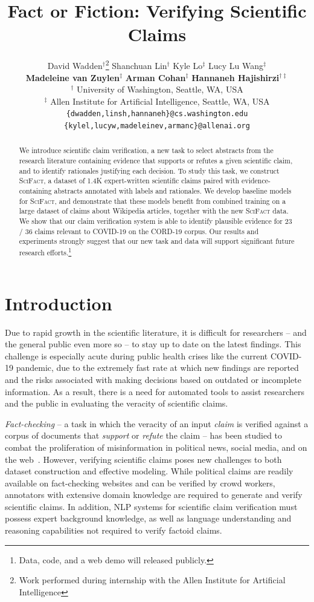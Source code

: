 \documentclass[11pt,a4paper]{article}
\title{Fact or Fiction: Verifying Scientific Claims}
\author{David Wadden$^\mathbf{\dagger}$\thanks{\xspace \xspace Work performed during internship with the Allen Institute for Artificial Intelligence} \quad
Shanchuan Lin$^\mathbf{\dagger}$ \quad
Kyle Lo$^\mathbf{\ddagger}$ \quad
Lucy Lu Wang$^\mathbf{\ddagger}$ \\
{\bf Madeleine van Zuylen}$^\mathbf{\ddagger}$ \quad
{\bf Arman Cohan}$^\mathbf{\ddagger}$ \quad
{\bf Hannaneh Hajishirzi}$^\mathbf{\dagger\ddagger}$\\
  $^\mathbf{\dagger}$
  University of Washington, Seattle, WA, USA \\
  $^\mathbf{\ddagger}$
  Allen Institute for Artificial Intelligence, Seattle, WA, USA \\
  {\tt\small \{dwadden,linsh,hannaneh\}@cs.washington.edu} \\
  {\tt\small \{kylel,lucyw,madeleinev,armanc\}@allenai.org}
}
\date{}
\newcommand{\ours}{\textsc{SciFact}\xspace}
\begin{document}
\maketitle


\begin{abstract}






We introduce scientific claim verification, a new task to select abstracts from the research literature containing evidence that supports or refutes a given scientific claim, and to identify rationales justifying each decision. To study this task, we construct \ours, a dataset of 1.4K expert-written scientific claims paired with evidence-containing abstracts annotated with labels and rationales. We develop baseline models for \ours, and demonstrate that these models benefit from combined training on a large dataset of claims about Wikipedia articles, together with the new \ours data. We show that our claim verification system is able to identify plausible evidence for 23 / 36 claims relevant to COVID-19 on the CORD-19 corpus. Our results and experiments strongly suggest that our new task and data will support significant future research efforts.\footnote{Data, code, and a web demo will released publicly.}


\end{abstract} \section{Introduction} \label{sec:introduction}




Due to rapid growth in the scientific literature, it is difficult for researchers -- and the general public even more so -- to stay up to date on the latest findings. This challenge is especially acute during public health crises like the current COVID-19 pandemic, due to the extremely fast rate at which new findings are reported and the risks associated with making decisions based on outdated or incomplete information. As a result, there is a need for automated tools to assist researchers and the public in evaluating the veracity of scientific claims. 


\emph{Fact-checking} -- a task in which the veracity of an input \emph{claim} is verified against a corpus of documents that \emph{support} or \emph{refute} the claim -- has been studied to combat the proliferation of misinformation in political news, social media, and on the web~\cite{Thorne2018FEVERAL,Hanselowski2019ARA}. However, verifying scientific claims poses new challenges to both dataset construction and effective modeling. While political claims are readily available on fact-checking websites and can be verified by crowd workers, annotators with extensive domain knowledge are required to generate and verify scientific claims. In addition, NLP systems for scientific claim verification must possess expert background knowledge, as well as language understanding and reasoning capabilities not required to verify factoid claims. 
\end{document}
